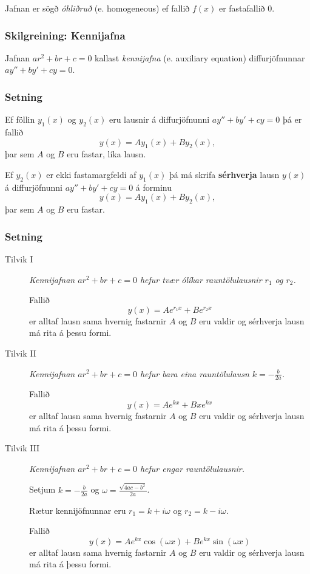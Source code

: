 \documentclass[icelandic,a4paper,12pt]{article}
\begin{document}
Jafnan er sögð \emph{óhliðruð} (e. homogeneous) ef fallið $f(x)$ er fastafallið 0. 

\subsubsection{Skilgreining: Kennijafna} 
Jafnan $ar^2+br+c=0$ kallast \emph{kennijafna} (e. auxiliary equation) diffurjöfnunnar $ay''+by'+cy=0$.

\subsubsection{Setning}  
Ef föllin $y_1(x)$ og $y_2(x)$ eru lausnir á diffurjöfnunni $ay''+by'+cy=0$ þá er fallið
$$y(x)=Ay_1(x)+By_2(x),$$ þar sem $A$ og $B$ eru fastar, líka lausn. 

Ef $y_2(x)$ er ekki fastamargfeldi af $y_1(x)$ þá má skrifa \textbf{sérhverja} lausn $y(x)$ á
diffurjöfnunni $ay''+by'+cy=0$ á forminu $$y(x)=Ay_1(x)+By_2(x),$$ þar sem $A$ og $B$ eru fastar.

\subsubsection{Setning}
\begin{description}
\item[Tilvik I] \emph{Kennijafnan $ar^2+br+c=0$ hefur tvær ólíkar rauntölulausnir
$r_1$ og $r_2$.}

Fallið $$y(x)=Ae^{r_1x}+Be^{r_2x}$$ er alltaf lausn sama hvernig fastarnir $A$ og $B$ eru valdir og
sérhverja lausn má rita á þessu formi.

\item[Tilvik II] \emph{Kennijafnan $ar^2+br+c=0$ hefur bara eina rauntölulausn
$k=-\frac{b}{2a}$.}

Fallið $$y(x)=Ae^{kx}+Bxe^{kx}$$ er alltaf lausn sama hvernig fastarnir $A$ og $B$ 
eru valdir og sérhverja lausn má rita á þessu formi.

\item[Tilvik III] \emph{Kennijafnan $ar^2+br+c=0$ hefur engar rauntölulausnir.}

Setjum $k=-\frac{b}{2a}$ og $\omega=\frac{\sqrt{4ac-b^2}}{2a}$. 

Rætur kennijöfnunnar eru $r_1=k+i\omega$ og $r_2=k-i\omega$.

Fallið
$$y(x)=Ae^{kx}\cos(\omega x)+Be^{kx}\sin(\omega x)$$
er alltaf lausn sama hvernig fastarnir $A$ og $B$ eru valdir  og
sérhverja lausn má rita á þessu formi.
\end{description}
\end{document}
